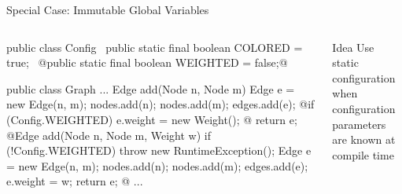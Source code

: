 \begin{frame}[fragile]{Special Case: Immutable Global Variables}
		\begin{columns}
\begin{tiny}
\begin{codetight}{}
public class Config {
	~public static final boolean COLORED = true;~
	@public static final boolean WEIGHTED = false;@
}
\end{codetight}
\begin{codetight}{}
public class Graph {
	...
	Edge add(Node n, Node m) {
		Edge e = new Edge(n, m);
		nodes.add(n); nodes.add(m); edges.add(e);
		@if (Config.WEIGHTED) { e.weight = new Weight(); }@
		return e;
	}
	@Edge add(Node n, Node m, Weight w) {
		if (!Config.WEIGHTED) { throw new RuntimeException(); }
		Edge e = new Edge(n, m);
		nodes.add(n); nodes.add(m); edges.add(e);
		e.weight = w;
		return e;
	}@
	...
}
\end{codetight}
\end{tiny}	
				\begin{definition}{Idea}
					Use static configuration when configuration parameters are known at compile time
				\end{definition}
		\end{columns}
\end{frame}

